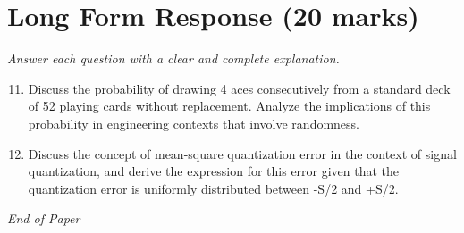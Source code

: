 \documentclass[12pt]{article}
\begin{document}
\section*{Long Form Response (20 marks)}
\textit{Answer each question with a clear and complete explanation.}
\begin{enumerate}[label=\arabic*.]
\setcounter{enumi}{10}
\item Discuss the probability of drawing 4 aces consecutively from a standard deck of 52 playing cards without replacement. Analyze the implications of this probability in engineering contexts that involve randomness.
\item Discuss the concept of mean-square quantization error in the context of signal quantization, and derive the expression for this error given that the quantization error is uniformly distributed between -S/2 and +S/2.
\end{enumerate}

\vfill
\noindent\textit{End of Paper}
\end{document}
